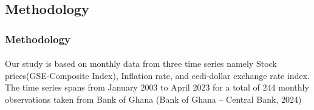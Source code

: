 \documentclass[12pt]{beamer}
\begin{document}
	

			\begin{frame}
			
			\section{Methodology}
			
		\frametitle{Methodology}
		\framesubtitle{ }
	Our study is based on monthly data from three time
		series namely Stock prices(GSE-Composite Index), Inflation
		rate, and cedi-dollar exchange rate index. The time series
		spans from January 2003 to April 2023 for a total of 244
		monthly observations taken from Bank of Ghana 	(Bank of Ghana – Central Bank, 2024) 
	
	

		
		
		  {} %
		
		
	\end{frame}
	
		
	
	
	
	
		
\end{document}
